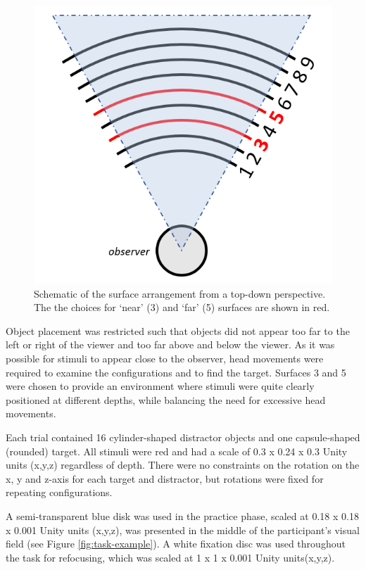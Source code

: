 \documentclass[
  english,
  man,floatsintext]{apa7}
\begin{document}
\begin{figure}

{\centering \includegraphics[width=0.6\linewidth]{VR_schematic} 

}

\caption{Schematic of the surface arrangement from a top-down perspective. The the choices for `near' (3) and `far' (5) surfaces are shown in red.}\label{fig:schematic}
\end{figure}

Object placement was restricted such that objects did not appear too far to the left or right of the viewer and too far above and below the viewer. As it was possible for stimuli to appear close to the observer, head movements were required to examine the configurations and to find the target. Surfaces 3 and 5 were chosen to provide an environment where stimuli were quite clearly positioned at different depths, while balancing the need for excessive head movements.

Each trial contained 16 cylinder-shaped distractor objects and one capsule-shaped (rounded) target. All stimuli were red and had a scale of 0.3 x 0.24 x 0.3 Unity units (x,y,z) regardless of depth. There were no constraints on the rotation on the x, y and z-axis for each target and distractor, but rotations were fixed for repeating configurations.

A semi-transparent blue disk was used in the practice phase, scaled at 0.18 x 0.18 x 0.001 Unity units (x,y,z), was presented in the middle of the participant's visual field (see Figure \ref{fig:task-example}). A white fixation disc was used throughout the task for refocusing, which was scaled at 1 x 1 x 0.001 Unity units(x,y,z).
\end{document}
